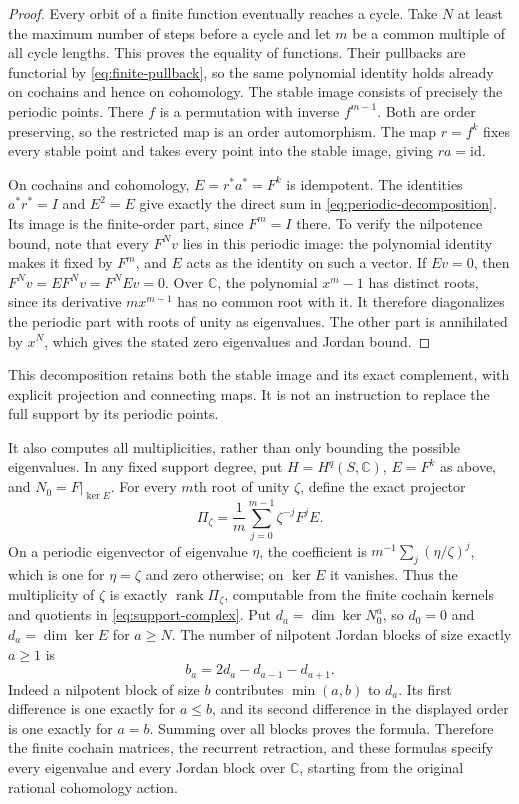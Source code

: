 \documentclass[11pt,a4paper]{article}
\theoremstyle{definition}\newtheorem{definition}[theorem]{Definition}
\newcommand{\C}{\mathbb C}\newcommand{\R}{\mathbb R}
\begin{document}
\begin{proof}
Every orbit of a finite function eventually reaches a cycle. Take $N$
at least the maximum number of steps before a cycle and let $m$ be
a common multiple of all cycle lengths. This proves the equality of
functions. Their pullbacks are functorial by
\eqref{eq:finite-pullback}, so the same polynomial identity holds
already on cochains and hence on cohomology.
The stable image consists of precisely the periodic points. There
$f$ is a permutation with inverse $f^{m-1}$. Both are order preserving,
so the restricted map is an order automorphism. The map $r=f^k$ fixes
every stable point and takes every point into the stable image,
giving $ra=\mathrm{id}$.

On cochains and cohomology, $E=r^*a^*=F^k$ is idempotent.
The identities $a^*r^*=I$ and $E^2=E$ give exactly the direct sum
in \eqref{eq:periodic-decomposition}. Its image is the finite-order
part, since $F^m=I$ there. To verify the nilpotence bound, note that
every $F^N v$ lies in this periodic image: the polynomial identity
makes it fixed by $F^m$, and $E$ acts as the identity on such a vector.
If $Ev=0$, then $F^Nv=EF^Nv=F^NEv=0$.
Over $\C$, the polynomial $x^m-1$ has distinct roots, since its
derivative $mx^{m-1}$ has no common root with it. It therefore
diagonalizes the periodic part with roots of unity as eigenvalues.
The other part is annihilated by $x^N$, which gives the stated zero
eigenvalues and Jordan bound.
\end{proof}

This decomposition retains both the stable image and its exact
complement, with explicit projection and connecting maps. It is not
an instruction to replace the full support by its periodic points.

It also computes all multiplicities, rather than only bounding the
possible eigenvalues. In any fixed support degree, put $H=H^q(S,\C)$,
$E=F^k$ as above, and $N_0=F|_{\ker E}$. For every $m$th root of
unity $\zeta$, define the exact projector
\[
 \Pi_\zeta=\frac1m\sum_{j=0}^{m-1}\zeta^{-j}F^jE.
 \tag{SE10a}\label{eq:periodic-projectors}
\]
On a periodic eigenvector of eigenvalue $\eta$, the coefficient is
$m^{-1}\sum_j(\eta/\zeta)^j$, which is one for $\eta=\zeta$
and zero otherwise; on $\ker E$ it vanishes. Thus the multiplicity
of $\zeta$ is exactly $\operatorname{rank}\Pi_\zeta$, computable
from the finite cochain kernels and quotients in
\eqref{eq:support-complex}. Put $d_a=\dim\ker N_0^a$, so $d_0=0$
and $d_a=\dim\ker E$ for $a\ge N$. The number of nilpotent Jordan
blocks of size exactly $a\ge1$ is
\[
 b_a=2d_a-d_{a-1}-d_{a+1}.
 \tag{SE10b}\label{eq:nilpotent-block-count}
\]
Indeed a nilpotent block of size $b$ contributes $\min(a,b)$ to
$d_a$. Its first difference is one exactly for $a\le b$, and
its second difference in the displayed order is one exactly for
$a=b$. Summing over all blocks proves the formula. Therefore the
finite cochain matrices, the recurrent retraction, and these formulas
specify every eigenvalue and every Jordan block over $\C$, starting
from the original rational cohomology action.
\end{document}
